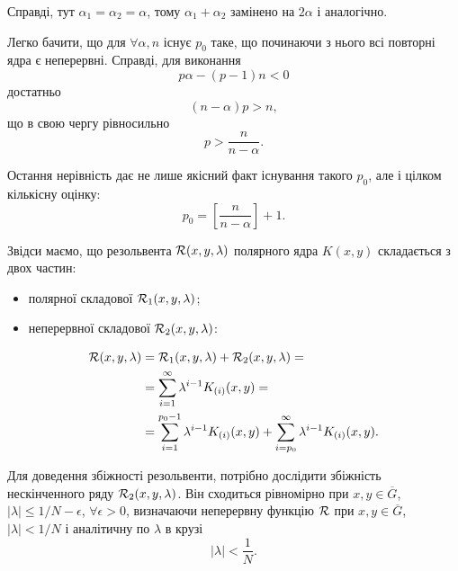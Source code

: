 \begin{remark}
	Справді, тут $\alpha_1 = \alpha_2 = \alpha$, тому $\alpha_1 + \alpha_2$ замінено на $2 \alpha$ і аналогічно.
\end{remark}

Легко бачити, що для $\forall \alpha, n$ існує $p_0$ таке, що починаючи з нього всі повторні ядра є неперервні. Справді, для виконання
\begin{equation}
	p \alpha - (p - 1) n < 0
\end{equation}
достатньо
\begin{equation}
	(n - \alpha) p > n,
\end{equation}
що в свою чергу рівносильно
\begin{equation}
	p > \dfrac{n}{n - \alpha}.
\end{equation} 

\begin{remark}
	Остання нерівність дає не лише якісний факт існування такого $p_0$, але і цілком кількісну оцінку:
	\begin{equation}
		p_0 = \left[ \dfrac{n}{n - \alpha} \right] + 1.
	\end{equation}
\end{remark}

Звідси маємо, що резольвента $\cal{R}(x, y, \lambda)$ полярного ядра $K(x, y)$ складається з двох частин:
\begin{itemize}
	\item полярної складової $\cal{R}_1(x, y, \lambda)$;
	\item неперервної складової $\cal{R}_2(x, y, \lambda)$:
\end{itemize}%
\begin{equation}
	\begin{aligned}
		\cal{R}(x, y, \lambda) &= \cal{R}_1(x, y, \lambda) + \cal{R}_2(x, y, \lambda) = \\
		&= \Sum_{i = 1}^\infty \lambda^{i - 1} K_{(i)}(x, y) = \\
		&= \Sum_{i = 1}^{p_0 - 1} \lambda^{i - 1} K_{(i)}(x, y) + \Sum_{i = p_0}^\infty \lambda^{i - 1} K_{(i)}(x, y).
	\end{aligned}
\end{equation}

Для доведення збіжності резольвенти, потрібно дослідити збіжність нескінченного ряду $\cal{R}_2(x, y, \lambda)$. Він сходиться рівномірно при $x, y \in \overline G$, $|\lambda| \le 1 / N - \epsilon$, $\forall \epsilon > 0$, визначаючи неперервну функцію $\cal{R}$ при $x, y \in \overline G$, $|\lambda| < 1 / N$ і аналітичну по $\lambda$ в крузі 
\begin{equation}
	|\lambda| < \dfrac{1}{N}.
\end{equation}

